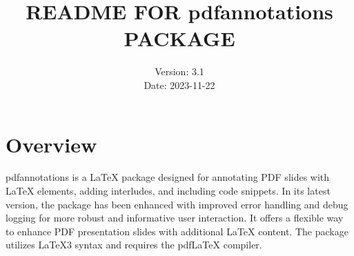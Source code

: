 \documentclass{article}
\title{README FOR pdfannotations PACKAGE}
\date{Version: 3.1\\Date: 2023-11-22}
\author{}
\begin{document}
\maketitle

\section*{Overview}
pdfannotations is a \LaTeX{} package designed for annotating PDF slides with \LaTeX{} elements, adding interludes, and including code snippets. In its latest version, the package has been enhanced with improved error handling and debug logging for more robust and informative user interaction. It offers a flexible way to enhance PDF presentation slides with additional \LaTeX{} content. The package utilizes \LaTeX3 syntax and requires the pdf\LaTeX{} compiler.
\end{document}
